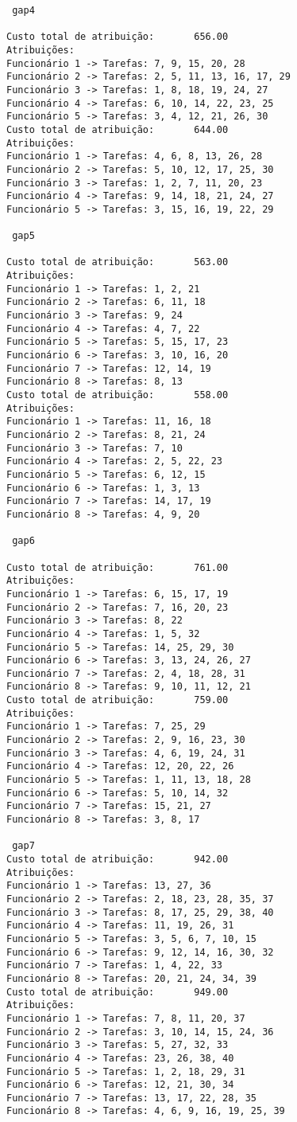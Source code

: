 \documentclass[
  letterpaper,
  DIV=11,
  numbers=noendperiod]{scrartcl}
\begin{document}
\begin{verbatim}
 gap4

Custo total de atribuição:       656.00
Atribuições:
Funcionário 1 -> Tarefas: 7, 9, 15, 20, 28
Funcionário 2 -> Tarefas: 2, 5, 11, 13, 16, 17, 29
Funcionário 3 -> Tarefas: 1, 8, 18, 19, 24, 27
Funcionário 4 -> Tarefas: 6, 10, 14, 22, 23, 25
Funcionário 5 -> Tarefas: 3, 4, 12, 21, 26, 30
Custo total de atribuição:       644.00
Atribuições:
Funcionário 1 -> Tarefas: 4, 6, 8, 13, 26, 28
Funcionário 2 -> Tarefas: 5, 10, 12, 17, 25, 30
Funcionário 3 -> Tarefas: 1, 2, 7, 11, 20, 23
Funcionário 4 -> Tarefas: 9, 14, 18, 21, 24, 27
Funcionário 5 -> Tarefas: 3, 15, 16, 19, 22, 29

 gap5

Custo total de atribuição:       563.00
Atribuições:
Funcionário 1 -> Tarefas: 1, 2, 21
Funcionário 2 -> Tarefas: 6, 11, 18
Funcionário 3 -> Tarefas: 9, 24
Funcionário 4 -> Tarefas: 4, 7, 22
Funcionário 5 -> Tarefas: 5, 15, 17, 23
Funcionário 6 -> Tarefas: 3, 10, 16, 20
Funcionário 7 -> Tarefas: 12, 14, 19
Funcionário 8 -> Tarefas: 8, 13
Custo total de atribuição:       558.00
Atribuições:
Funcionário 1 -> Tarefas: 11, 16, 18
Funcionário 2 -> Tarefas: 8, 21, 24
Funcionário 3 -> Tarefas: 7, 10
Funcionário 4 -> Tarefas: 2, 5, 22, 23
Funcionário 5 -> Tarefas: 6, 12, 15
Funcionário 6 -> Tarefas: 1, 3, 13
Funcionário 7 -> Tarefas: 14, 17, 19
Funcionário 8 -> Tarefas: 4, 9, 20

 gap6

Custo total de atribuição:       761.00
Atribuições:
Funcionário 1 -> Tarefas: 6, 15, 17, 19
Funcionário 2 -> Tarefas: 7, 16, 20, 23
Funcionário 3 -> Tarefas: 8, 22
Funcionário 4 -> Tarefas: 1, 5, 32
Funcionário 5 -> Tarefas: 14, 25, 29, 30
Funcionário 6 -> Tarefas: 3, 13, 24, 26, 27
Funcionário 7 -> Tarefas: 2, 4, 18, 28, 31
Funcionário 8 -> Tarefas: 9, 10, 11, 12, 21
Custo total de atribuição:       759.00
Atribuições:
Funcionário 1 -> Tarefas: 7, 25, 29
Funcionário 2 -> Tarefas: 2, 9, 16, 23, 30
Funcionário 3 -> Tarefas: 4, 6, 19, 24, 31
Funcionário 4 -> Tarefas: 12, 20, 22, 26
Funcionário 5 -> Tarefas: 1, 11, 13, 18, 28
Funcionário 6 -> Tarefas: 5, 10, 14, 32
Funcionário 7 -> Tarefas: 15, 21, 27
Funcionário 8 -> Tarefas: 3, 8, 17

 gap7
Custo total de atribuição:       942.00
Atribuições:
Funcionário 1 -> Tarefas: 13, 27, 36
Funcionário 2 -> Tarefas: 2, 18, 23, 28, 35, 37
Funcionário 3 -> Tarefas: 8, 17, 25, 29, 38, 40
Funcionário 4 -> Tarefas: 11, 19, 26, 31
Funcionário 5 -> Tarefas: 3, 5, 6, 7, 10, 15
Funcionário 6 -> Tarefas: 9, 12, 14, 16, 30, 32
Funcionário 7 -> Tarefas: 1, 4, 22, 33
Funcionário 8 -> Tarefas: 20, 21, 24, 34, 39
Custo total de atribuição:       949.00
Atribuições:
Funcionário 1 -> Tarefas: 7, 8, 11, 20, 37
Funcionário 2 -> Tarefas: 3, 10, 14, 15, 24, 36
Funcionário 3 -> Tarefas: 5, 27, 32, 33
Funcionário 4 -> Tarefas: 23, 26, 38, 40
Funcionário 5 -> Tarefas: 1, 2, 18, 29, 31
Funcionário 6 -> Tarefas: 12, 21, 30, 34
Funcionário 7 -> Tarefas: 13, 17, 22, 28, 35
Funcionário 8 -> Tarefas: 4, 6, 9, 16, 19, 25, 39
\end{verbatim}
\end{document}
